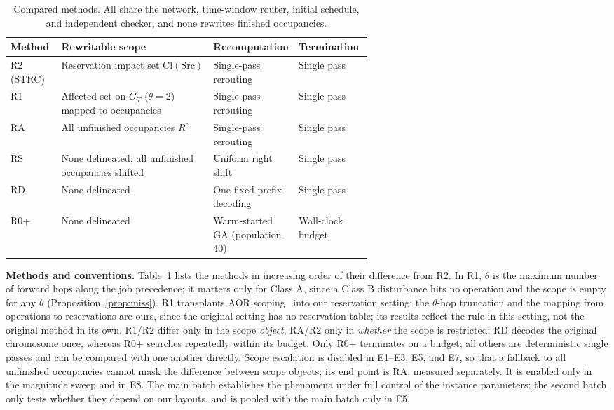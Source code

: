 \documentclass[manuscript,screen,review]{acmart}
\providecommand{\STRC}{\textsc{STRC}}
\begin{document}
\begin{table}[t]
\centering
\caption{Compared methods. All share the network, time-window router, initial schedule, and independent checker, and none rewrites finished occupancies.}
\label{tab:baselines}
\small
\begin{tabular}{@{}lp{0.42\linewidth}p{0.18\linewidth}l@{}}
\toprule
Method & Rewritable scope & Recomputation & Termination \\
\midrule
R2 (\STRC) & Reservation impact set \(\mathrm{Cl}(\mathrm{Src})\) & Single-pass rerouting & Single pass \\
R1 & Affected set on \(G_T\) (\(\theta=2\)) mapped to occupancies & Single-pass rerouting & Single pass \\
RA & All unfinished occupancies \(R^{\circ}\) & Single-pass rerouting & Single pass \\
RS & None delineated; all unfinished occupancies shifted & Uniform right shift & Single pass \\
RD & None delineated & One fixed-prefix decoding & Single pass \\
R0+ & None delineated & Warm-started GA (population \(40\)) & Wall-clock budget \\
\bottomrule
\end{tabular}
\end{table}

\textbf{Methods and conventions.}
Table~\ref{tab:baselines} lists the methods in increasing order of their difference from R2. In R1, \(\theta\) is the maximum number of forward hops along the job precedence; it matters only for Class A, since a Class B disturbance hits no operation and the scope is empty for any \(\theta\) (Proposition~\ref{prop:miss}). R1 transplants AOR scoping~\cite{subramaniam2003maor} into our reservation setting: the \(\theta\)-hop truncation and the mapping from operations to reservations are ours,
since the original setting has no reservation table; its results reflect the rule in this setting, not the original method in its own.
R1/R2 differ only in the scope \emph{object}, RA/R2 only in \emph{whether} the scope is restricted; RD decodes the original chromosome once, whereas R0+ searches repeatedly within its budget.
Only R0+ terminates on a budget; all others are deterministic single passes and can be compared with one another directly.
Scope escalation is disabled in E1--E3, E5, and E7, so that a fallback to all unfinished occupancies cannot mask the difference between scope objects; its end point is RA, measured separately.
It is enabled only in the magnitude sweep and in E8.
The main batch establishes the phenomena under full control of the instance parameters; the second batch only tests whether they depend on our layouts, and is pooled with the main batch only in E5.
\end{document}
